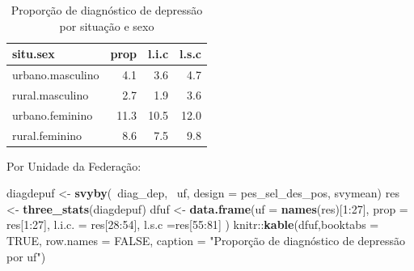 \documentclass[]{book}
\newenvironment{Shaded}{\begin{snugshade}}{\end{snugshade}}
\newcommand{\KeywordTok}[1]{\textcolor[rgb]{0.13,0.29,0.53}{\textbf{{#1}}}}
\newcommand{\DataTypeTok}[1]{\textcolor[rgb]{0.13,0.29,0.53}{{#1}}}
\newcommand{\DecValTok}[1]{\textcolor[rgb]{0.00,0.00,0.81}{{#1}}}
\newcommand{\StringTok}[1]{\textcolor[rgb]{0.31,0.60,0.02}{{#1}}}
\newcommand{\OtherTok}[1]{\textcolor[rgb]{0.56,0.35,0.01}{{#1}}}
\newcommand{\NormalTok}[1]{{#1}}
\numberwithin{example}{chapter}
\numberwithin{remark}{chapter}
\numberwithin{definition}{chapter}
\begin{document}
\begin{table}

\caption{\label{tab:unnamed-chunk-44}Proporção de diagnóstico de depressão por situação e sexo}
\centering
\begin{tabular}[t]{lrrr}
\toprule
situ.sex & prop & l.i.c & l.s.c\\
\midrule
urbano.masculino & 4.1 & 3.6 & 4.7\\
rural.masculino & 2.7 & 1.9 & 3.6\\
urbano.feminino & 11.3 & 10.5 & 12.0\\
rural.feminino & 8.6 & 7.5 & 9.8\\
\bottomrule
\end{tabular}
\end{table}

Por Unidade da Federação:

\begin{Shaded}
\begin{Highlighting}[]
\NormalTok{diagdepuf <-}\StringTok{ }\KeywordTok{svyby}\NormalTok{(~diag_dep, ~uf, }\DataTypeTok{design =} \NormalTok{pes_sel_des_pos, svymean)}
\NormalTok{res <-}\StringTok{ }\KeywordTok{three_stats}\NormalTok{(diagdepuf)}
\NormalTok{dfuf <-}\StringTok{ }\KeywordTok{data.frame}\NormalTok{(}\DataTypeTok{uf =} \KeywordTok{names}\NormalTok{(res)[}\DecValTok{1}\NormalTok{:}\DecValTok{27}\NormalTok{], }\DataTypeTok{prop =} \NormalTok{res[}\DecValTok{1}\NormalTok{:}\DecValTok{27}\NormalTok{], }
  \DataTypeTok{l.i.c. =} \NormalTok{res[}\DecValTok{28}\NormalTok{:}\DecValTok{54}\NormalTok{], }\DataTypeTok{l.s.c =}\NormalTok{res[}\DecValTok{55}\NormalTok{:}\DecValTok{81}\NormalTok{]  )}
\NormalTok{knitr::}\KeywordTok{kable}\NormalTok{(dfuf,}\DataTypeTok{booktabs =} \OtherTok{TRUE}\NormalTok{, }\DataTypeTok{row.names =} \OtherTok{FALSE}\NormalTok{, }
\DataTypeTok{caption =} \StringTok{"Proporção de diagnóstico de depressão por uf"}\NormalTok{)}
\end{Highlighting}
\end{Shaded}
\end{document}
